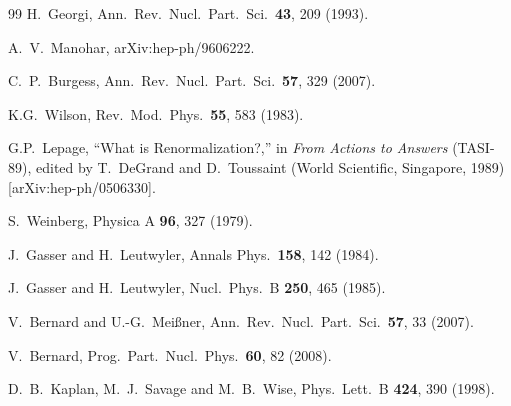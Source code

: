\documentclass[aps,rmp,nofootinbib,twocolumn,floatfix]{revtex4}
\begin{document}
\begin{thebibliography}{99}
  H.~Georgi,
  Ann.\ Rev.\ Nucl.\ Part.\ Sci.\  {\bf 43}, 209 (1993).

  A.~V.~Manohar,
  arXiv:hep-ph/9606222.

  C.~P.~Burgess,
  Ann.\ Rev.\ Nucl.\ Part.\ Sci.\  {\bf 57}, 329 (2007).

K.G.~Wilson,
Rev.\ Mod.\ Phys.\ {\bf 55}, 583 (1983).

G.P.~Lepage, ``What is Renormalization?,''
in {\it From Actions to Answers} (TASI-89), edited by
        T.~DeGrand and D.~Toussaint (World Scientific, Singapore, 1989)
[arXiv:hep-ph/0506330].


  S.~Weinberg, 
  Physica A {\bf 96}, 327 (1979). 

  J.~Gasser and H.~Leutwyler, 
  Annals Phys.\  {\bf 158}, 142 (1984). 
 
  J.~Gasser and H.~Leutwyler, 
  Nucl.\ Phys.\  B {\bf 250}, 465 (1985). 
 
  V.~Bernard and U.-G.~Mei{\ss}ner, 
  Ann.\ Rev.\ Nucl.\ Part.\ Sci.\  {\bf 57}, 33 (2007).

  V.~Bernard,
  Prog.\ Part.\ Nucl.\ Phys.\  {\bf 60}, 82 (2008).

  D.~B.~Kaplan, M.~J.~Savage and M.~B.~Wise,
  Phys.\ Lett.\  B {\bf 424}, 390 (1998).


\end{thebibliography}
\end{document}
